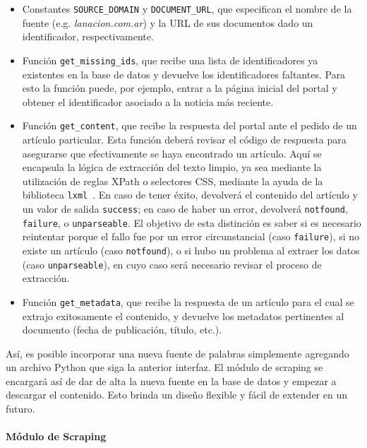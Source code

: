 \begin{itemize}

\item Constantes \texttt{SOURCE\_DOMAIN} y \texttt{DOCUMENT\_URL}, que especifican el nombre de la
fuente (e.g. \textit{lanacion.com.ar}) y la URL de sus documentos dado un identificador,
respectivamente.

\item Función \texttt{get\_missing\_ids}, que recibe una lista de identificadores ya existentes en la
base de datos y devuelve los identificadores faltantes. Para esto la función puede, por ejemplo,
entrar a la página inicial del portal y obtener el identificador asociado a la noticia más reciente.

\item Función \texttt{get\_content}, que recibe la respuesta del portal ante el pedido de un artículo
particular. Esta función deberá revisar el código de respuesta para asegurarse que efectivamente se
haya encontrado un artículo. Aquí se encapsula la lógica de extracción del texto limpio, ya sea
mediante la utilización de reglas XPath o selectores CSS, mediante la ayuda de la biblioteca
\texttt{lxml}~\cite{LXML}. En caso de tener éxito, devolverá el contenido del artículo y un valor de
salida \texttt{success}; en caso de haber un error, devolverá \texttt{notfound}, \texttt{failure}, o
\texttt{unparseable}. El objetivo de esta distinción es saber si es necesario reintentar porque el
fallo fue por un error circunstancial (caso \texttt{failure}), si no existe un artículo (caso
\texttt{notfound}), o si hubo un problema al extraer los datos (caso \texttt{unparseable}), en cuyo
caso será necesario revisar el proceso de extracción.

\item Función \texttt{get\_metadata}, que recibe la respuesta de un artículo para el cual se extrajo
exitosamente el contenido, y devuelve los metadatos pertinentes al documento (fecha de publicación,
título, etc.).

\end{itemize}

Así, es posible incorporar una nueva fuente de palabras simplemente agregando un archivo Python que
siga la anterior interfaz. El módulo de scraping se encargará así de dar de alta la nueva fuente en
la base de datos y empezar a descargar el contenido. Esto brinda un diseño flexible y fácil de
extender en un futuro.


\paragraph{Módulo de Scraping}

